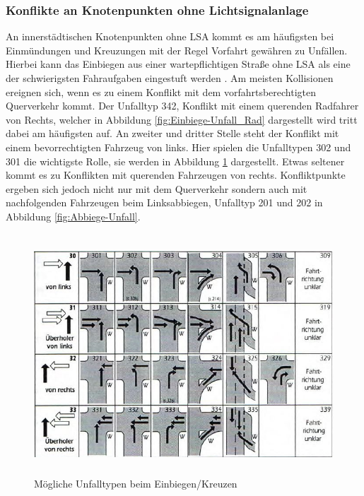 \subsubsection{Konflikte an Knotenpunkten ohne Lichtsignalanlage}\label{chapter:Knotenpunkte ohne LSA}
An innerstädtischen Knotenpunkten ohne \ac{LSA} kommt es am häufigsten bei Einmündungen und Kreuzungen mit der Regel Vorfahrt gewähren zu Unfällen. Hierbei kann das Einbiegen aus einer wartepflichtigen Straße ohne \ac{LSA} als eine der schwierigsten Fahraufgaben eingestuft werden \parencite[S. 90]{Reichart.2001}. Am meisten Kollisionen ereignen sich, wenn es zu einem Konflikt mit dem vorfahrtsberechtigten Querverkehr kommt. Der Unfalltyp 342, Konflikt mit einem querenden Radfahrer von Rechts, welcher in Abbildung \ref{fig:Einbiege-Unfall_Rad} dargestellt wird tritt dabei am häufigsten auf. An zweiter und dritter Stelle steht der Konflikt mit einem bevorrechtigten Fahrzeug von links. Hier spielen die Unfalltypen 302 und 301 die wichtigste Rolle, sie werden in Abbildung \ref{fig:Einbiege-Unfall} dargestellt. Etwas seltener kommt es zu Konflikten mit querenden Fahrzeugen von rechts. Konfliktpunkte ergeben sich jedoch nicht nur mit dem Querverkehr sondern auch mit nachfolgenden Fahrzeugen beim Linksabbiegen, Unfalltyp 201 und 202 in Abbildung \ref{fig:Abbiege-Unfall}.

\begin{savenotes}
	\begin{figure}[H]
		\centering
		\includegraphics[width=13cm,height=9cm]{figures/Einbiege-Unfall}
		\caption[Unfalltyp 3 Einbiegen/Kreuzen-Unfall]{Mögliche Unfalltypen beim Einbiegen/Kreuzen \parencite[S. 13]{GesamtverbandderDeutschenVersicherungswirtschafte.V..2016}}\label{fig:Einbiege-Unfall}
	\end{figure}
\end{savenotes}

